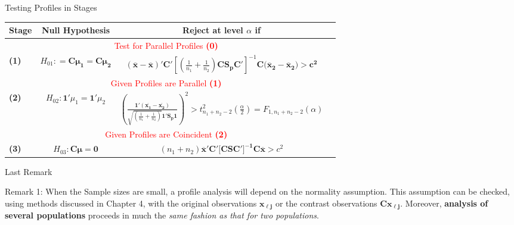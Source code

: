 \documentclass[8pt]{beamer}
\begin{document}
    \begin{frame}{Testing Profiles in Stages}
    \begin{adjustwidth}{-2em}{-2em}
    \renewcommand{\arraystretch}{2.5}
        \begin{center}
            \begin{tabular}{lccc}
            \hline
            \textbf{Stage} & \textbf{Null Hypothesis} & \textbf{Reject at level $\alpha$ if} \\ 
            \hline
                \multicolumn{3}{c}{\textcolor{red}{Test for Parallel Profiles \textbf{(0)}}}\\
                \textbf{(1)} & $H_{01}: = \mathbf{C\mu_{1}} = \mathbf{C\mu_{2}}$ & $(\overline{\mathbf{x}} - \overline{\mathbf{x}})'\mathbf{C}'[(\frac{1}{n_{1}} + \frac{1}{n_{2}})\mathbf{CS_{p}C'}]^{-1}\mathbf{C}(\mathbf{\overline{x}_{2} - \overline{x}_{2}) > c^{2}}$ \\
                \multicolumn{3}{c}{\textcolor{red}{Given Profiles are Parallel \textbf{(1)}}}\\
                \textbf{(2)} & $H_{02}:\mathbf{1'}\mu_{1} = \mathbf{1'}\mu_{2}$ & $\left(\frac{\mathbf{1}'(\mathbf{\overline{x_{1}}} - \mathbf{\overline{x_{2}}}) }{\sqrt{\left(\frac{1}{n_{1}} + \frac{1}{n_{2}}\right)} \mathbf{1'S_{p}1}}\right)^{2} > t^{2}_{n_{1} + n_{2} - 2}\left(\frac{\alpha}{2}\right) = F_{1,n_{1} + n_{2} -2}(\alpha)$ \\
                \multicolumn{3}{c}{\textcolor{red}{Given Profiles are Coincident \textbf{(2)}}}\\
                \textbf{(3)} & $H_{03}: \mathbf{C\mu} = \mathbf{0}$ & $(n_{1} + n_{2})\overline{\mathbf{x}}'\mathbf{C}'[\mathbf{CSC']^{-1}}\mathbf{C\overline{x}} > c^{2}$\\
            \hline
            \end{tabular}
        \end{center}
    \end{adjustwidth}
    \end{frame}
    
    \begin{frame}{Last Remark}
        \begin{alertblock}{Remark 1:}
            When the Sample sizes are small, a profile analysis will depend on the normality assumption. This assumption can be checked, using methods discussed in Chapter 4, with the original observations $\mathbf{x_{\ell j}}$ or the contrast observations $\mathbf{Cx_{\ell j}}$. Moreover, \textbf{analysis of several populations} proceeds in much the \textit{same fashion as that for two populations}. 
        \end{alertblock}
    \end{frame}
    
\end{document}
